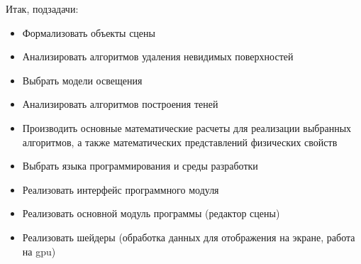 


Итак, подзадачи:

\begin{itemize}
    \setlength{\itemsep}{0em}
    \item Формализовать объекты сцены
    \item Анализировать алгоритмов удаления невидимых поверхностей
    \item Выбрать модели освещения
    \item Анализировать алгоритмов построения теней
    \item Производить основные математические расчеты для реализации выбранных алгоритмов,    а также математических представлений физических свойств
    \item Выбрать языка программирования и среды разработки
    \item Реализовать интерфейс программного модуля
    \item Реализовать основной модуль программы (редактор сцены)
    \item Реализовать шейдеры (обработка данных для отображения на экране, работа на gpu)
\end{itemize}
